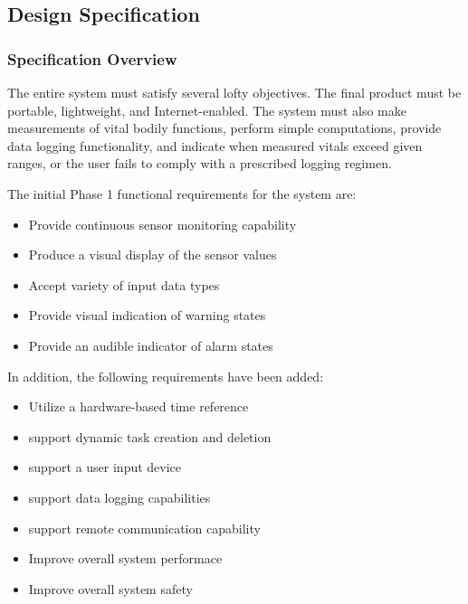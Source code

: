 \documentclass[12pt]{article} %
\begin{document}
\subsection{Design Specification\label{sec:designSpec}} 

\subsubsection{Specification Overview}
The entire system must satisfy several lofty objectives. The final product must
be portable, lightweight, and Internet-enabled. The system must also make
measurements of vital bodily functions, perform simple computations, provide
data logging functionality, and indicate when measured vitals exceed given
ranges, or the user fails to comply with a prescribed logging regimen. \\

\begin{itemize}[$$]
  \item The initial Phase 1 functional requirements for the system are:
    \begin{itemize}[$\bullet$]
      \item Provide continuous sensor monitoring capability
      \item Produce a visual display of the sensor values
      \item Accept variety of input data types
      \item Provide visual indication of warning states
      \item Provide an audible indicator of alarm states
    \end{itemize}
  \item In addition, the following requirements have been added:
    \begin{itemize}[$\bullet$]
      \item Utilize a hardware-based time reference
      \item support dynamic task creation and deletion
      \item support a user input device
      \item support data logging capabilities
      \item support remote communication capability
      \item Improve overall system performace
      \item Improve overall system safety
    \end{itemize}
\end{itemize}
\end{document}
